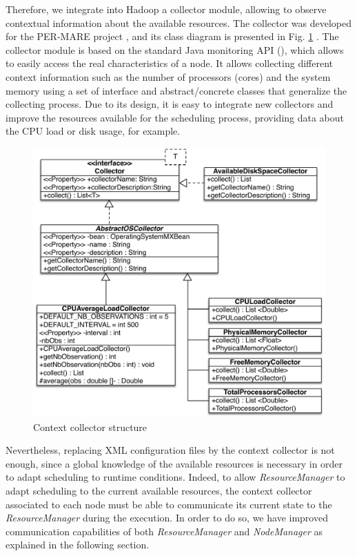 Therefore, we integrate into Hadoop a collector module, allowing to observe contextual information about the available resources. The collector was developed for the PER-MARE project \cite{PER-MARE}, and its class diagram is presented in Fig. \ref{fig:CollectorDiag} \cite{UBICOMM2014}. 
The collector module is based on the standard Java monitoring API (\cite{Oracle}), which allows to easily access the real characteristics of a node. It allows collecting different context information such as the number of processors (cores) and the system memory using a set of interface and abstract/concrete classes that generalize the collecting process. Due to its design, it is easy to integrate new collectors and improve the resources available for the scheduling process, providing data about the CPU load or disk usage, for example.

\begin{figure}[!ht]
	\centering
	\includegraphics[width=1\linewidth]{img/CollectorUML2.pdf}
	\caption{Context collector structure}
	\label{fig:CollectorDiag}
\end{figure}

Nevertheless, replacing XML configuration files by the context collector is not enough, since a global knowledge of the available resources is necessary in order to adapt scheduling to runtime conditions. Indeed, to allow \textit{ResourceManager} to adapt scheduling to the current available resources, the context collector associated to each node must be able to communicate its current state to the \textit{ResourceManager} during the execution. In order to do so, we have improved communication capabilities of both \textit{ResourceManager} and \textit{NodeManager} as explained in the following section.    

